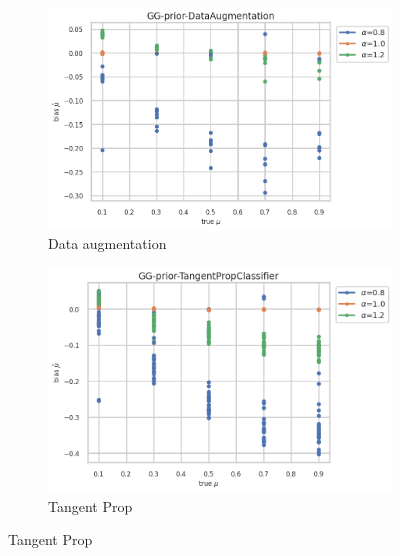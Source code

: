 \begin{figure}[ht!]
  \begin{subfigure}[t]{0.49\linewidth}
    \includegraphics[width=\linewidth]{COMPARE/GG-prior/DataAugmentation/profusion_true_mu_target_bias.png}
    \caption{Data augmentation}
  \end{subfigure}%
  \hfill
  \begin{subfigure}[t]{0.49\linewidth}
    \includegraphics[width=\linewidth]{COMPARE/GG-prior/TangentPropClassifier/profusion_true_mu_target_bias.png}
    \caption{Tangent Prop}
  \end{subfigure}


\end{figure}

